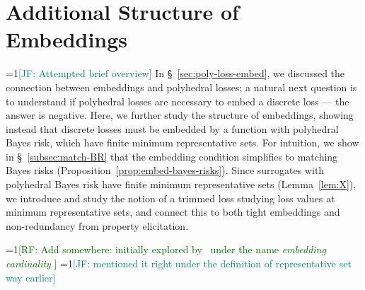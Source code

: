 \documentclass[11pt]{article}
\newcommand{\Comments}{1}
\newcommand{\mynote}[2]{\ifnum\Comments=1\textcolor{#1}{#2}\fi}
\newcommand{\mytodo}[2]{\ifnum\Comments=1%
  \todo[linecolor=#1!80!black,backgroundcolor=#1,bordercolor=#1!80!black]{#2}\fi}
\newcommand{\raf}[1]{\mynote{darkgreen}{[RF: #1]}}
\newcommand{\jessie}[1]{\mynote{teal}{[JF: #1]}}
\newcommand{\jessiet}[1]{\mytodo{teal!20!white}{JF: #1}}
\newcommand{\prop}[1]{\mathrm{prop}[#1]}
\newcommand{\simplex}{\Delta_\Y}
\newcommand{\Y}{\mathcal{Y}}
\newcommand{\inprod}[2]{\langle #1, #2 \rangle}%
\newcommand{\elltopk}{\ell^{\text{top-$k$}}}
\begin{document}
%
%
%
%





\section{Additional Structure of Embeddings}
\label{sec:min-rep-sets}

\jessie{Attempted brief overview}
In \S~\ref{sec:poly-loss-embed}, we discussed the connection between embeddings and polyhedral losses; a natural next question is to understand if polyhedral losses are necessary to embed a discrete loss --- the answer is negative.
Here, we further study the structure of embeddings, showing instead that discrete losses must be embedded by a function with polyhedral Bayes risk, which have finite minimum representative sets.
For intuition, we show in \S~\ref{subsec:match-BR} that the embedding condition simplifies to matching Bayes risks (Proposition~\ref{prop:embed-bayes-risks}).
Since surrogates with polyhedral Bayes risk have finite minimum representative sets (Lemma~\ref{lem:X}), we introduce and study the notion of a trimmed loss studying loss values at minimum representative sets, and connect this to both tight embeddings and non-redundancy from property elicitation.
 

\raf{Add somewhere: initially explored by~\citet{wang2020weston} under the name \emph{embedding cardinality} }
\jessie{mentioned it right under the definition of representative set way earlier}
\end{document}
